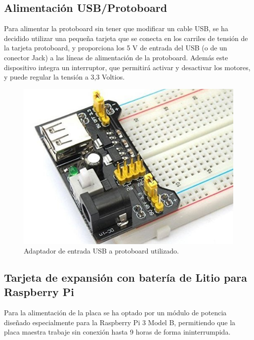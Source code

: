 \subsection{ Alimentación USB/Protoboard }

Para alimentar la protoboard sin tener que modificar un cable USB, se ha decidido utilizar una pequeña tarjeta que se conecta en los carriles de tensión de la tarjeta protoboard, y
proporciona los 5 V de entrada del USB (o de un conector Jack) a las líneas de alimentación de la protoboard. Además este dispositivo integra un interruptor, que permitirá activar y
desactivar los motores, y puede regular la tensión a 3,3 Voltios.\\

\begin{figure}[H]
  \begin{center}
    \includegraphics[scale=0.3]{imagenes/alimentador_usb_protoboard.jpg}
  \end{center}
  \caption{Adaptador de entrada USB a protoboard utilizado.}
  \label{figura:alimentador_placa_usb_protoboard}
\end{figure}


\subsection{ Tarjeta de expansión con batería de Litio para Raspberry Pi }
\label{componente:bateria-expansion}

Para la alimentación de la placa se ha optado por un módulo de potencia diseñado especialmente para la Raspberry Pi 3 Model B, permitiendo que la placa maestra trabaje sin conexión hasta 9 horas
de forma ininterrumpida.\\

